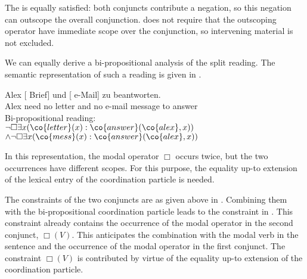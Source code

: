 \documentclass[output=paper]{langsci/langscibook}
\begin{document}
The \SemATB{} is equally satisfied: both conjuncts contribute a negation, so this negation can outscope the overall conjunction. \SemATB{} does not require that the outscoping operator have immediate scope over the conjunction, so intervening material is not excluded.




We can equally derive a bi-propositional analysis of the split reading. 
The semantic representation of such a reading is given in .

\ea \label{brauch-brief-mail-bi}
\begin{xlist}
\ex 
\gll Alex  [ Brief] und [ e-Mail] zu beantworten.\\
Alex need \hphantom{[}no letter and \hphantom{[}no {e-mail message} to answer\\
\glt {}
\ex 
Bi-propositional reading:\\
$\lnot \Box \exists x (\co{letter}(x) : \co{answer}(\co{alex}, x))$\\
\hspace*{\fill}$\land 
\lnot \Box \exists x (\co{mess}(x) : \co{answer}(\co{alex}, x)) 
$
\end{xlist}
\z 

In this representation, the modal operator $\Box$ occurs twice, but the two occurrences have different scopes. 
For this purpose, the equality up-to extension of the lexical entry of the coordination particle is needed.



The constraints of the two conjuncts are as given above in . 
Combining them with the bi-propositional coordination particle leads to the constraint in .
This constraint already contains the occurrence of the modal operator in the second conjunct, $\Box(V)$. 
This anticipates the combination with the modal verb in the sentence and the occurrence of the modal operator in the first conjunct. The constraint $\Box(V)$ is contributed by virtue of the equality up-to extension of the coordination particle. 
\end{document}
